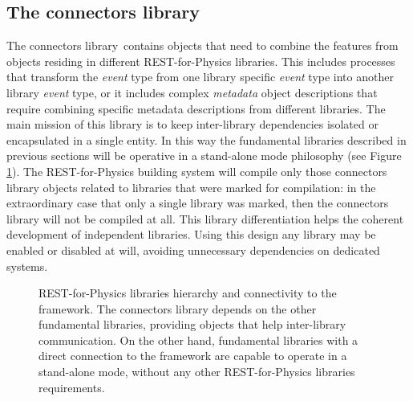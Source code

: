 \subsection{The connectors library}\label{sc:connectorslib}

The connectors library\,\cite{REST_Connectors_Git} contains objects that need to combine the features from objects residing in different REST-for-Physics libraries. This includes processes that transform the \emph{event} type from one library specific \emph{event} type into another library \emph{event} type, or it includes complex \emph{metadata} object descriptions that require combining specific metadata descriptions from different libraries. The main mission of this library is to keep inter-library dependencies isolated or encapsulated in a single entity. In this way the fundamental libraries described in previous sections will be operative in a stand-alone mode philosophy (see Figure\,\ref{fig:connectorslib}). The REST-for-Physics building system will compile only those connectors library objects related to libraries that were marked for compilation: in the extraordinary case that only a single library was marked, then the connectors library will not be compiled at all. This library differentiation helps the coherent development of independent libraries. Using this design any library may be enabled or disabled at will, avoiding unnecessary dependencies on dedicated systems.

\begin{figure}[htb!]
  \centering
	\caption{REST-for-Physics libraries hierarchy and connectivity to the framework. The connectors library depends on the other fundamental libraries, providing objects that help inter-library communication. On the other hand, fundamental libraries with a direct connection to the framework are capable to operate in a stand-alone mode, without any other REST-for-Physics libraries requirements.}\label{fig:connectorslib}
\end{figure}

